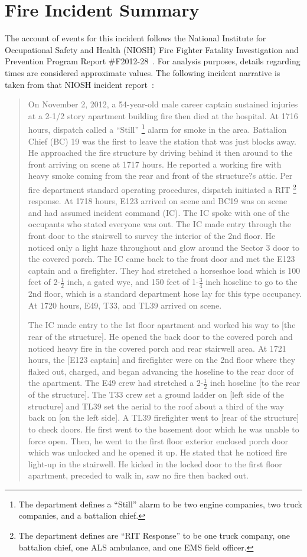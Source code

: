 \documentclass[11pt,oneside]{book}
\begin{document}
\chapter{Fire Incident Summary}
\label{fire_sum}
The account of events for this incident follows the National Institute for Occupational Safety and Health (NIOSH) Fire Fighter Fatality Investigation and Prevention Program Report \#F2012-28~\cite{NIOSH:Bowyer}. For analysis purposes, details regarding times are considered approximate values. The following incident narrative is taken from that NIOSH incident report~\cite{NIOSH:Bowyer}:
\begin{quote}
On November 2, 2012, a 54-year-old male career captain sustained injuries at a 2-1/2 story apartment building fire then died at the hospital. At 1716 hours, dispatch called a ``Still'' \footnote{The department defines a ``Still'' alarm to be two engine companies, two truck companies, and a battalion chief.} alarm for smoke in the area. Battalion Chief (BC) 19 was the first to leave the station that was just blocks away. He approached the fire structure by driving behind it then around to the front arriving on scene at 1717 hours. He reported a working fire with heavy smoke coming from the rear and front of the structure?s attic. Per fire department standard operating procedures, dispatch initiated a RIT \footnote{The department defines are ``RIT Response'' to be one truck company, one battalion chief, one ALS ambulance, and one EMS field officer.} response. At 1718 hours, E123 arrived on scene and BC19 was on scene and had assumed incident command (IC). The IC spoke with one of the occupants who stated everyone was out. The IC made entry through the front door to the stairwell to survey the interior of the 2nd floor. He noticed only a light haze throughout and glow around the Sector 3 door to the covered porch. The IC came back to the front door and met the E123 captain and a firefighter. They had stretched a horseshoe load which is 100 feet of 2-$\tfrac{1}{2}$ inch, a gated wye, and 150 feet of 1-$\tfrac{3}{4}$ inch hoseline to go to the 2nd floor, which is a standard department hose lay for this type occupancy. At 1720 hours, E49, T33, and TL39 arrived on scene.

The IC made entry to the 1st floor apartment and worked his way to [the rear of the structure]. He opened the back door to the covered porch and noticed heavy fire in the covered porch and rear stairwell area. At 1721 hours, the [E123 captain] and firefighter were on the 2nd floor where they flaked out, charged, and began advancing the hoseline to the rear door of the apartment. The E49 crew had stretched a 2-$\tfrac{1}{2}$ inch hoseline [to the rear of the structure]. The T33 crew set a ground ladder on [left side of the structure] and TL39 set the aerial to the roof about a third of the way back on [on the left side]. A TL39 firefighter went to [rear of the structure] to check doors. He first went to the basement door which he was unable to force open. Then, he went to the first floor exterior enclosed porch door which was unlocked and he opened it up. He stated that he noticed fire light-up in the stairwell. He kicked in the locked door to the first floor apartment, preceded to walk in, saw no fire then backed out.


\end{quote}
\end{document}
